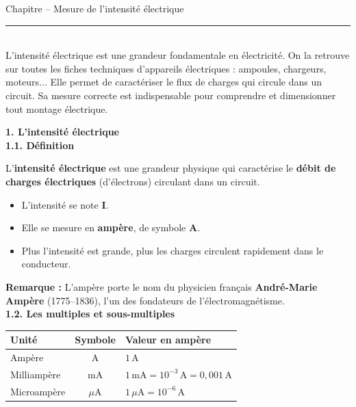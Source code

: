 \documentclass[11pt,a4paper]{article}
\renewcommand{\arraystretch}{2}
\begin{document}
\begin{center}
 \LARGE{Chapitre -- Mesure de l'intensité électrique}
\end{center}

\normalsize

\hrule\
\\[0,2cm]

L'intensité électrique est une grandeur fondamentale en électricité. On la retrouve sur toutes les fiches techniques d'appareils électriques : ampoules, chargeurs, moteurs... Elle permet de caractériser le flux de charges qui circule dans un circuit. Sa mesure correcte est indispensable pour comprendre et dimensionner tout montage électrique.

\vspace{3mm}

\textbf{1. L'intensité électrique} \\

\textbf{1.1. Définition}

\begin{tcolorbox}[colback=red!5!white,colframe=red!75!black]
{
L'\textbf{intensité électrique} est une grandeur physique qui caractérise le \textbf{débit de charges électriques} (d'électrons) circulant dans un circuit.

\begin{itemize}
    \item L'intensité se note \textbf{I}.
    \item Elle se mesure en \textbf{ampère}, de symbole \textbf{A}.
    \item Plus l'intensité est grande, plus les charges circulent rapidement dans le conducteur.
\end{itemize}
}
\end{tcolorbox}

\textbf{Remarque : } L'ampère porte le nom du physicien français \textbf{André-Marie Ampère} (1775--1836), l'un des fondateurs de l'électromagnétisme. \\

\textbf{1.2. Les multiples et sous-multiples}

\begin{tcolorbox}[colback=red!5!white,colframe=red!75!black]
{
\begin{center}
\renewcommand{\arraystretch}{1.5}
\begin{tabular}{|l|c|l|}
\hline
\textbf{Unité} & \textbf{Symbole} & \textbf{Valeur en ampère} \\
\hline
Ampère       & A    & $1\,\text{A}$ \\
\hline
Milliampère  & mA   & $1\,\text{mA} = 10^{-3}\,\text{A} = 0{,}001\,\text{A}$ \\
\hline
Microampère  & $\mu$A & $1\,\mu\text{A} = 10^{-6}\,\text{A}$ \\
\hline
\end{tabular}
\end{center}
}
\end{tcolorbox}
\end{document}

